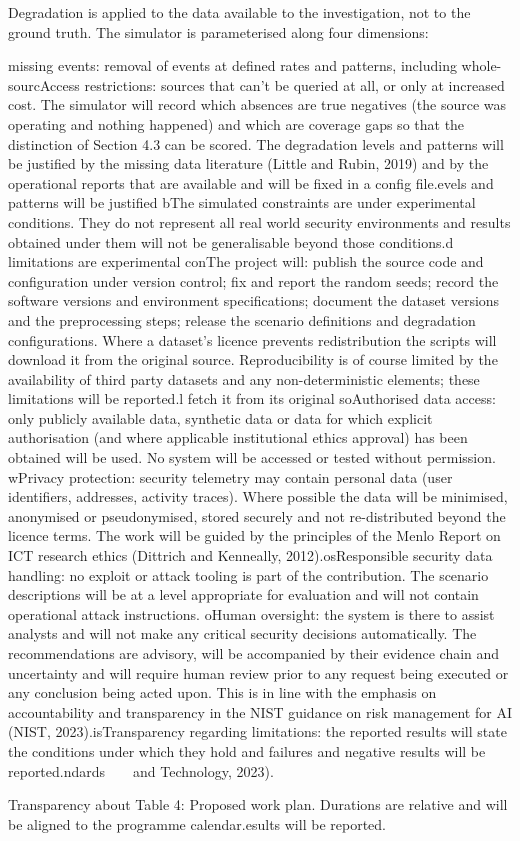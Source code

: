 \documentclass[a4paper,11pt]{article}
\begin{document}
Degradation is applied to the data available to the investigation, not to the ground truth. The simulator is parameterised along four dimensions:\par
missing events: removal of events at defined rates and patterns, including whole-sourcAccess restrictions: sources that can't be queried at all, or only at increased cost. The simulator will record which absences are true negatives (the source was operating and nothing happened) and which are coverage gaps so that the distinction of Section 4.3 can be scored. The degradation levels and patterns will be justified by the missing data literature (Little and Rubin, 2019) and by the operational reports that are available and will be fixed in a config file.evels and patterns will be justified bThe simulated constraints are under experimental conditions. They do not represent all real world security environments and results obtained under them will not be generalisable beyond those conditions.d limitations are experimental conThe project will: publish the source code and configuration under version control; fix and report the random seeds; record the software versions and environment specifications; document the dataset versions and the preprocessing steps; release the scenario definitions and degradation configurations. Where a dataset's licence prevents redistribution the scripts will download it from the original source. Reproducibility is of course limited by the availability of third party datasets and any non-deterministic elements; these limitations will be reported.l fetch it from its original soAuthorised data access: only publicly available data, synthetic data or data for which explicit authorisation (and where applicable institutional ethics approval) has been obtained will be used. No system will be accessed or tested without permission. wPrivacy protection: security telemetry may contain personal data (user identifiers, addresses, activity traces). Where possible the data will be minimised, anonymised or pseudonymised, stored securely and not re-distributed beyond the licence terms. The work will be guided by the principles of the Menlo Report on ICT research ethics (Dittrich and Kenneally, 2012).osResponsible security data handling: no exploit or attack tooling is part of the contribution. The scenario descriptions will be at a level appropriate for evaluation and will not contain operational attack instructions. oHuman oversight: the system is there to assist analysts and will not make any critical security decisions automatically. The recommendations are advisory, will be accompanied by their evidence chain and uncertainty and will require human review prior to any request being executed or any conclusion being acted upon. This is in line with the emphasis on accountability and transparency in the NIST guidance on risk management for AI (NIST, 2023).isTransparency regarding limitations: the reported results will state the conditions under which they hold and failures and negative results will be reported.ndards     and Technology, 2023).\par
Transparency about Table 4: Proposed work plan. Durations are relative and will be aligned to the programme calendar.esults will be reported.\par
\end{document}

